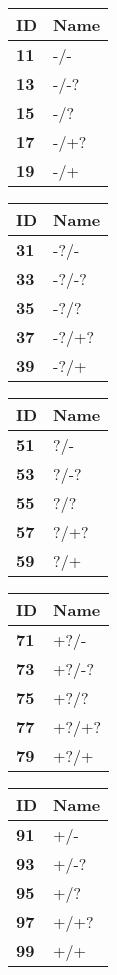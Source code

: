 \begin{description}
  \begin{minipage}[t]{3.15cm}
    \begin{tabular}{>{\bfseries}p{0.6cm} p{1.4cm}}
      ID & \textbf{Name}\\ \hline \hline
      11 & -/-\\ \hline
      13 & -/-?\\ \hline
      15 & -/?\\ \hline
      17 & -/+?\\ \hline
      19 & -/+\\ \hline
    \end{tabular}
  \end{minipage}
  \begin{minipage}[t]{3.15cm}
    \begin{tabular}{>{\bfseries}p{0.6cm} p{1.4cm}}
      ID & \textbf{Name}\\ \hline \hline
      31 & -?/-\\ \hline
      33 & -?/-?\\ \hline
      35 & -?/?\\ \hline
      37 & -?/+?\\ \hline
      39 & -?/+\\ \hline
    \end{tabular}
  \end{minipage}
  \begin{minipage}[t]{3.15cm}
    \begin{tabular}{>{\bfseries}p{0.6cm} p{1.4cm}}
      ID & \textbf{Name}\\ \hline \hline
      51 & ?/-\\ \hline
      53 & ?/-?\\ \hline
      55 & ?/?\\ \hline
      57 & ?/+?\\ \hline
      59 & ?/+\\ \hline
    \end{tabular}
  \end{minipage}
  \begin{minipage}[t]{3.15cm}
    \begin{tabular}{>{\bfseries}p{0.6cm} p{1.4cm}}
      ID & \textbf{Name}\\ \hline \hline
      71 & +?/-\\ \hline
      73 & +?/-?\\ \hline
      75 & +?/?\\ \hline
      77 & +?/+?\\ \hline
      79 & +?/+\\ \hline
    \end{tabular}
  \end{minipage}
  \begin{tabular}{>{\bfseries}p{0.6cm} p{1.4cm}}
    ID & \textbf{Name}\\ \hline \hline
    91 & +/-\\ \hline
    93 & +/-?\\ \hline
    95 & +/?\\ \hline
    97 & +/+?\\ \hline
    99 & +/+\\ \hline
  \end{tabular}


\end{description}
